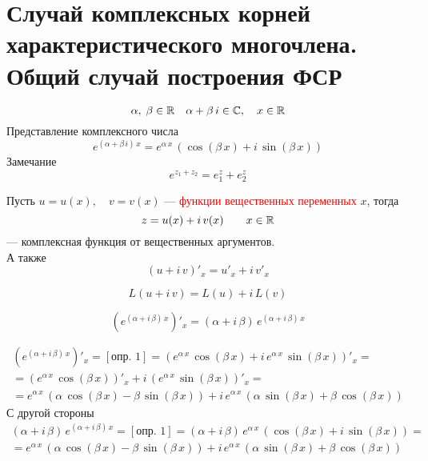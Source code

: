 \author{Tkachuk Andrei}

\section{Случай комплексных корней характеристического многочлена. Общий случай построения ФСР}

\begin{Def}
    \[
        \alpha,\; \beta \in \mathbb{R} \quad \alpha + \beta\,i \in \mathbb{C}, \quad x\in\mathbb{R}
    \]
    Представление комплексного числа 
    \[
        e^{(\alpha + \beta\,i)\,x} = e^{\alpha\,x}\,(\cos(\beta\,x) + i\,\sin(\beta\,x))
    \]
    Замечание
    \[
        e^{z_1 + z_2} = e^z_1 + e^z_2
    \]
\end{Def}

\begin{Def}
    Пусть
    $u = u(x), \quad v = v(x)$ --- \textcolor{red}{функции вещественных переменных} $x$, тогда
    \[
        z = u(x) + i\,v(x) \qquad x\in\mathbb{R}
    \]
    --- комплексная функция от вещественных аргументов.\\
    А также
    \[
        (u + i\,v)'_x = u'_x + i\,v'_x
    \] 
\end{Def}

\begin{Note}
    \[
        L(u + i\,v) = L(u) + i\,L(v)
    \]  
\end{Note}

\begin{Note}
    \[
        (e^{(\alpha + i\,\beta)\,x})'_x = (\alpha + i\,\beta)\,e^{(\alpha + i\,\beta)\,x}
    \]    
\end{Note}

\begin{Proof}
    \begin{gather*}
        (e^{(\alpha + i\,\beta)\,x})'_x = [\text{опр. 1}] = (e^{\alpha\,x}\,\cos(\beta\,x) + i\,e^{\alpha\,x}\,\sin(\beta\,x))'_x = \\
        = (e^{\alpha\,x}\,\cos(\beta\,x))'_x + i\,(e^{\alpha\,x}\,\sin(\beta\,x))'_x =\\
        = e^{\alpha\,x}\,(\alpha\,\cos(\beta\,x) - \beta\,\sin(\beta\,x)) + i\,e^{\alpha\,x}\,(\alpha\,\sin(\beta\,x) + \beta\,\cos(\beta\,x))
    \end{gather*}
    С другой стороны
    \begin{gather*}
        (\alpha + i\,\beta)\,e^{(\alpha + i\,\beta)\,x} = [\text{опр. 1}] = (\alpha + i\,\beta)\,e^{\alpha\,x}\,(\cos(\beta\,x) + i\,\sin(\beta\,x)) =\\
        = e^{\alpha\,x}\,(\alpha\,\cos(\beta\,x) - \beta\,\sin(\beta\,x)) + i\,e^{\alpha\,x}\,(\alpha\,\sin(\beta\,x) + \beta\,\cos(\beta\,x)) 
    \end{gather*}
\end{Proof}

